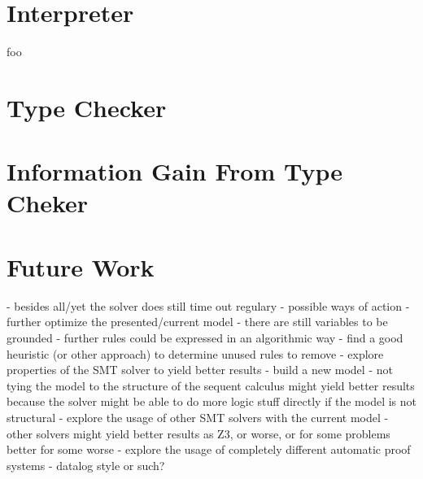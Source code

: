 \section{Interpreter}
foo

\section{Type Checker}

\section{Information Gain From Type Cheker}

\section{Future Work}

  - besides all/yet the solver does still time out regulary
  - possible ways of action
    - further optimize the presented/current model
      - there are still variables to be grounded
      - further rules could be expressed in an algorithmic way
      - find a good heuristic (or other approach) to determine unused rules to remove
      - explore properties of the SMT solver to yield better results
    - build a new model
      - not tying the model to the structure of the sequent calculus might yield better results
        because the solver might be able to do more logic stuff directly if the model is not structural
    - explore the usage of other SMT solvers with the current model
      - other solvers might yield better results as Z3,
        or worse, or for some problems better for some worse
    - explore the usage of completely different automatic proof systems
      - datalog style or such?

